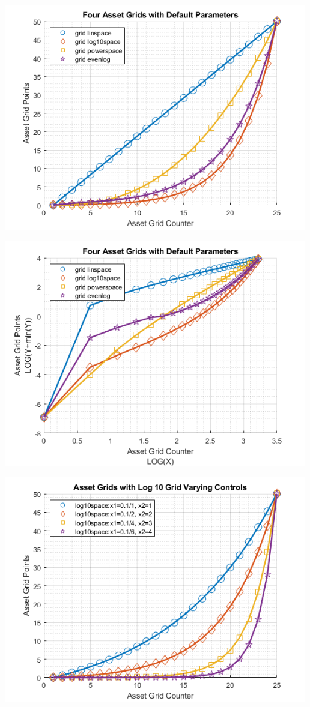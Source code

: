 \documentclass[
]{book}
\begin{document}
\includegraphics[width=5.20833in,height=\textheight]{img/fx_saveborr_grid_images/figure_0.png}

\includegraphics[width=5.20833in,height=\textheight]{img/fx_saveborr_grid_images/figure_1.png}

\includegraphics[width=5.20833in,height=\textheight]{img/fx_saveborr_grid_images/figure_2.png}
\end{document}

